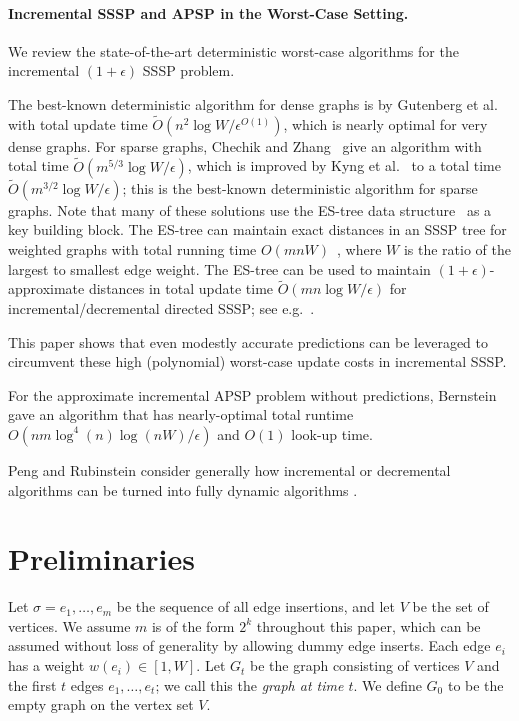 \documentclass[11pt]{article}
\begin{document}
\paragraph{Incremental SSSP and APSP in the Worst-Case Setting.} 
We review the state-of-the-art deterministic worst-case algorithms for the incremental $(1+\epsilon)$ SSSP problem.  

The best-known deterministic algorithm for dense graphs is by Gutenberg et al.~\cite{probst2020new} with total update time $\tilde{O}(n^2 \log W/\epsilon^{O(1)})$, which is nearly optimal for very dense graphs.  For sparse graphs,
Chechik and Zhang~\cite{chechik2021incremental} give an algorithm with total time $\tilde{O}(m^{5/3}\log W/\epsilon)$, which is improved by 
Kyng et al.~\cite{KyngMeGu22} to a total time $\tilde{O}(m^{3/2}\log W /\epsilon)$; this is the best-known deterministic algorithm for sparse graphs.  Note that many of these solutions use the ES-tree data structure~\cite{shiloach1981line} as a key building block. The ES-tree can maintain exact distances in an SSSP tree for weighted graphs with total running time $O(mnW)$~\cite{henzinger1995fully}, where $W$ is the ratio of the largest to smallest edge weight. The ES-tree can be used to maintain $(1+\epsilon)$-approximate distances in total update time $\tilde{O}(mn\log W/\epsilon)$ for incremental/decremental directed SSSP; see e.g.~\cite{bernstein2009fully,bernstein2016maintaining,madry2010faster}.

This paper shows that even modestly accurate predictions can be leveraged to circumvent these high (polynomial) worst-case update costs in incremental SSSP.

For the approximate incremental APSP problem without predictions, Bernstein~\cite{bernstein2016maintaining} gave an algorithm that has nearly-optimal total runtime $O(nm \log^4 (n) \log (nW)/\epsilon)$ and $O(1)$ look-up time. 

Peng and Rubinstein consider generally how incremental or decremental algorithms can be turned into fully dynamic algorithms \cite{PengR23}. \section{Preliminaries}
\label{sec:prelim}
Let $\sigma = e_1, \ldots, e_m$ be the sequence of all edge insertions, and let $V$ be the set of vertices. 
We assume $m$ is of the form $2^k$ throughout this paper, which can be assumed without loss of generality by allowing dummy edge inserts.
Each edge $e_i$ has a weight $w(e_i) \in [1, W]$.
Let $G_t$ be the graph consisting of vertices $V$ and the first $t$ edges $e_1, \ldots, e_t$; we call this the \emph{graph at time $t$}. 
We define $G_0$ to be the empty graph on the vertex set $V$.
\end{document}
